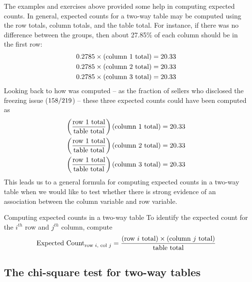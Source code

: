 The examples and exercises above provided some help
in computing expected counts.
In general, expected counts for a two-way table may
be computed using the row totals, column totals,
and the table total.
For instance, if there was no difference between the groups,
then about 27.85\% of each column should be in the first row:
\begin{align*}
0.2785{}\times (\text{column 1 total}) &= 20.33{} \\
0.2785{}\times (\text{column 2 total}) &= 20.33{} \\
0.2785{}\times (\text{column 3 total}) &= 20.33{}
\end{align*}
Looking back to how \iPodAFraction{} was computed --
as the fraction of sellers who disclosed the freezing issue
($158{}/219{}$) --
these three expected counts could have been computed as
\begin{align*}
\left(\frac{\text{row 1 total}}{\text{table total}}\right)
    \text{(column 1 total)} &= 20.33{} \\
\left(\frac{\text{row 1 total}}{\text{table total}}\right)
    \text{(column 2 total)} &= 20.33{} \\
\left(\frac{\text{row 1 total}}{\text{table total}}\right)
    \text{(column 3 total)} &= 20.33{}
\end{align*}
This leads us to a general formula for computing expected
counts in a two-way table when we would like to test whether
there is strong evidence of an association between the column
variable and row variable.

\begin{onebox}{Computing expected counts in a two-way table}
  To identify the expected count for the $i^{th}$ row
  and $j^{th}$ column, compute
  \begin{align*}
  \text{Expected Count}_{\text{row }i,\text{ col }j}
    = \frac{(\text{row $i$ total}) \times
        (\text{column $j$ total})}{\text{table total}}\vspace{2mm}
  \end{align*}
\end{onebox}


\subsection{The chi-square test for two-way tables}

